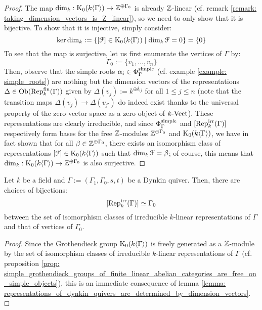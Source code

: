                 \begin{proof}
                    The map $\dim_k: \mathrm{K}_0(k\langle\Gamma\rangle) \to \mathbb{Z}^{\oplus \Gamma_0}$ is already $\mathbb{Z}$-linear (cf. remark \ref{remark: taking_dimension_vectors_is_Z_linear}), so we need to only show that it is bijective. To show that it is injective, simply consider:
                        $$\ker \dim_k := \{[\mathcal{F}] \in \mathrm{K}_0(k\langle\Gamma\rangle) \mid \dim_k \mathcal{F} = 0\} = \{0\}$$
                    To see that the map is surjective, let us first enumerate the vertices of $\Gamma$ by:
                        $$\Gamma_0 := \{v_1, ..., v_n\}$$
                    Then, observe that the simple roots $\alpha_i \in \Phi_{\Gamma}^{\mathrm{simple}}$ (cf. example \ref{example: simple_roots}) are nothing but the dimension vectors of the representations $\Delta \in \mathrm{Ob}(\mathrm{Rep}_k^{\mathrm{fin}}(\Gamma))$ given by $\Delta(v_j) := k^{\oplus \delta_{ij}}$ for all $1 \leq j \leq n$ (note that the transition maps $\Delta(v_j) \to \Delta(v_{j'})$ do indeed exist thanks to the universal property of the zero vector space as a zero object of $k\text{-}\mathrm{Vect}$). These representations are clearly irreducible, and since $\Phi_{\Gamma}^{\mathrm{simple}}$ and $[\mathrm{Rep}_k^{\mathrm{irr}}(\Gamma)]$ respectively form bases for the free $\mathbb{Z}$-modules $\mathbb{Z}^{\oplus \Gamma_0}$ and $\mathrm{K}_0(k\langle\Gamma\rangle)$, we have in fact shown that for all $\beta \in \mathbb{Z}^{\oplus \Gamma_0}$, there exists an isomorphism class of representations $[\mathcal{F}] \in \mathrm{K}_0(k\langle\Gamma\rangle)$ such that $\dim_k \mathcal{F} = \beta$; of course, this means that $\dim_k: \mathrm{K}_0(k\langle\Gamma\rangle) \to \mathbb{Z}^{\oplus \Gamma_0}$ is also surjective.
                \end{proof}
            \begin{corollary} \label{coro: irreducible_representations_of_finite_quivers_are_labelled_by_vertices}
                Let $k$ be a field and $\Gamma := (\Gamma_1, \Gamma_0, s, t)$ be a Dynkin quiver. Then, there are choices of bijections:
                    $$[\mathrm{Rep}_k^{\mathrm{irr}}(\Gamma)] \simeq \Gamma_0$$
                between the set of isomorphism classes of irreducible $k$-linear representations of $\Gamma$ and that of vertices of $\Gamma_0$.
            \end{corollary}
                \begin{proof}
                    Since the Grothendieck group $\mathrm{K}_0(k\langle\Gamma\rangle)$ is freely generated as a $\mathbb{Z}$-module by the set of isomorphism classes of irreducible $k$-linear representations of $\Gamma$ (cf. proposition \ref{prop: simple_grothendieck_groups_of_finite_linear_abelian_categories_are_free_on_simple_objects}), this is an immediate consequence of lemma \ref{lemma: representations_of_dynkin_quivers_are_determined_by_dimension_vectors}.
                \end{proof}
